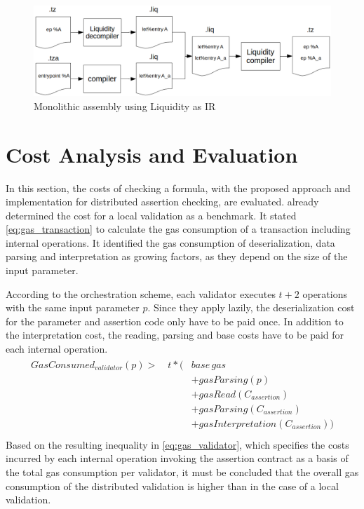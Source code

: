 \begin{figure}[t]
\centering
\includegraphics[width=\linewidth]{figures/5-offline_tezos/liquidity_assembly}
\caption{Monolithic assembly using Liquidity as IR}
\label{fig:liq_assembly}
\end{figure}

\section{Cost Analysis and Evaluation}\label{sec:cost_analysis_distributed}
In this section, the costs of checking a formula, with the proposed approach and implementation for distributed assertion checking, are evaluated.  already determined the cost for a local validation as a benchmark. It stated \eqref{eq:gas_transaction} to calculate the gas consumption of a transaction including internal operations. It identified the gas consumption of deserialization, data parsing and interpretation as growing factors, as they depend on the size of the input parameter.

According to the orchestration scheme, each validator executes $t+2$ operations with the same input parameter $p$. Since they apply lazily, the deserialization cost for the parameter and assertion code only have to be paid once. In addition to the interpretation cost, the reading, parsing and base costs have to be paid for each internal operation. 
\begin{align}\label{eq:gas_validator}
\begin{split}
GasConsumed_{validator}(p) > \quad t * (&base\, gas \\
&+ gasParsing(p) \\
&+ gasRead(C_{assertion}) \\
&+ gasParsing(C_{assertion}) \\
&+ gasInterpretation(C_{assertion})) \\
\end{split}
\end{align}
Based on the resulting inequality in \eqref{eq:gas_validator}, which specifies the costs incurred by each internal operation invoking the assertion contract as a basis of the total gas consumption per validator, it must be concluded that the overall gas consumption of the distributed validation is higher than in the case of a local validation.

